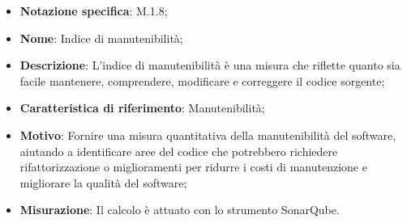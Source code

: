\begin{itemize}
    \item \textbf{Notazione specifica}: M.1.8;
    \item \textbf{Nome}: Indice di manutenibilità;
    \item \textbf{Descrizione}: L'indice di manutenibilità è una misura che riflette quanto sia facile mantenere, comprendere, modificare e correggere il codice sorgente;
    \item \textbf{Caratteristica di riferimento}: Manutenibilità;
    \item \textbf{Motivo}: Fornire una misura quantitativa della manutenibilità del software, aiutando a identificare aree del codice che potrebbero richiedere rifattorizzazione o miglioramenti per ridurre i costi di manutenzione e migliorare la qualità del software;
    \item \textbf{Misurazione}: Il calcolo è attuato con lo strumento SonarQube.
    
\end{itemize}
